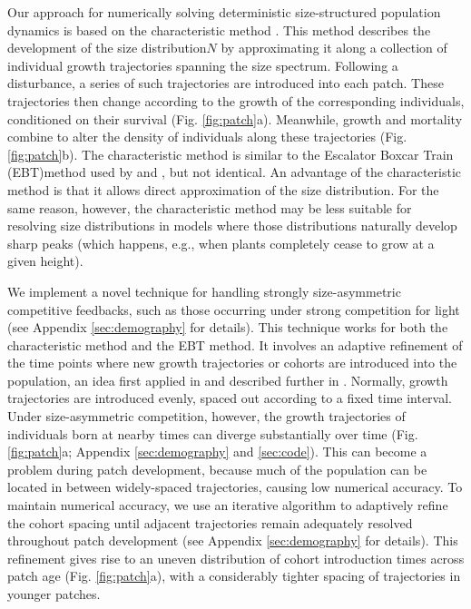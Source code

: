 \documentclass[a4paper,11pt]{article}
\begin{document}
Our approach for numerically solving deterministic size-structured population dynamics is
based on the characteristic method \citep{Angulo-2004}. This method describes the development of
the size distribution\(N\) by approximating it along a collection of individual growth trajectories spanning the size
spectrum. Following a disturbance, a series of such trajectories are introduced
into each patch. These trajectories then change according to the growth
of the corresponding individuals, conditioned on their survival
(Fig. \ref{fig:patch}a). Meanwhile, growth and mortality combine
to alter the density of individuals along these trajectories
(Fig. \ref{fig:patch}b). The characteristic method is similar to the Escalator Boxcar Train (\textsc{EBT})method
\citep{Deroos-1997} used by \citet{Falster-2011} and
\citet{Falster-2015}, but not identical. An advantage of the characteristic method is that it allows direct approximation of the size distribution. For the same reason, however, the characteristic method may be less suitable for resolving size distributions in models where those distributions naturally develop sharp peaks (which happens, e.g., when plants completely cease to grow at a given height).

We implement a novel technique for
handling strongly size-asymmetric competitive feedbacks, such as those occurring
under strong competition for light (see Appendix \ref{sec:demography}
for details). This technique works for both the characteristic method and the \textsc{EBT} method. It involves an
adaptive refinement of the time points where new growth trajectories or cohorts are introduced
into the population, an idea first applied in \citet{Falster-2011} and
described further in \citet{Falster-2015}.
Normally, growth trajectories are introduced evenly, spaced out according to a fixed time
interval. Under size-asymmetric competition, however, the growth
trajectories of individuals born at nearby times can diverge
substantially over time (Fig. \ref{fig:patch}a; Appendix
\ref{sec:demography} and \ref{sec:code}). This can become a problem during patch
development, because much of the population can be located in between
widely-spaced trajectories, causing low numerical accuracy. To maintain
numerical accuracy, we use an iterative algorithm to adaptively refine
the cohort spacing until adjacent trajectories remain
adequately resolved throughout patch development (see Appendix
\ref{sec:demography} for details). This refinement gives rise to an uneven
distribution of cohort introduction times across patch age (Fig.
\ref{fig:patch}a), with a considerably tighter spacing of trajectories in
younger patches.
\end{document}
